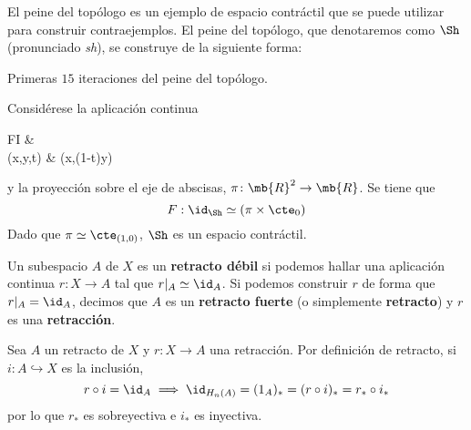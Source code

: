 \begin{example}
El peine del topólogo es un ejemplo de espacio contráctil que se puede utilizar
para construir contraejemplos. El peine del topólogo, que denotaremos como $\Sh$
(pronunciado \emph{sh}), se construye de la siguiente forma:

\begin{marginfigure}
\caption{Primeras $15$ iteraciones del peine del topólogo.}
\end{marginfigure}

Considérese la aplicación continua
\begin{diag}
F\colon \Sh\times I \arrow[r]             & \Sh                   \\[-8mm]
(x,y,t) \arrow[r, maps to] & (x,(1-t)y)
\end{diag}
y la proyección sobre el eje de abscisas, $\pi\colon \mb{R}^2 \to \mb{R}$. Se
tiene que
\[F: \id_\Sh \simeq (\pi\times \cte_0)\]
Dado que $\pi \simeq \cte_{(1,0)}$, $\Sh$ es un espacio contráctil.
\end{example}

\begin{defn}
Un subespacio $A$ de $X$ es un \textbf{retracto débil} si podemos hallar una
aplicación continua $r\colon X \to A$ tal que $r|_A\simeq \id_A$. Si podemos
construir $r$ de forma que $r|_A=\id_A$, decimos que $A$ es un \textbf{retracto
fuerte} (o simplemente \textbf{retracto}) y $r$ es una \textbf{retracción}.
\end{defn}

Sea $A$ un retracto de $X$ y $r\colon X \to A$ una retracción. Por definición de
retracto, si $i\colon A \hookrightarrow X$ es la inclusión,
\[r\circ i=\id_A \implies \id_{H_n(A)}=(1_A)_*=(r\circ i)_*=r_*\circ i_*\]
por lo que $r_*$ es sobreyectiva e $i_*$ es inyectiva.

